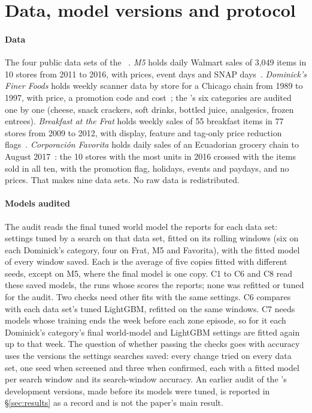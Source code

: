 \section{Data, model versions and protocol}
\label{sec:versions}

\paragraph{Data}
The four public data sets of the \companion{} ~\cite{rwm}. \emph{M5} holds
daily Walmart sales of 3,049 items in 10 stores from 2011 to 2016, with prices,
event days and SNAP days~\cite{m5accuracy}. \emph{Dominick's Finer Foods} holds
weekly scanner data by store for a Chicago chain from 1989 to 1997, with price,
a promotion code and cost~\cite{dominicks}; the \companion{} 's six
categories are audited one by one (cheese, snack crackers, soft drinks, bottled
juice, analgesics, frozen entrees). \emph{Breakfast at the Frat} holds weekly
sales of 55 breakfast items in 77 stores from 2009 to 2012, with display,
feature and tag-only price reduction flags~\cite{frat}. \emph{Corporaci\'on
Favorita} holds daily sales of an Ecuadorian grocery chain to August
2017~\cite{favorita}: the 10 stores with the most units in 2016 crossed with the
items sold in all ten, with the promotion flag, holidays, events and paydays,
and no prices. That makes nine data sets. No raw data is redistributed.

\paragraph{Models audited}
The audit reads the final tuned world model the \companion{}  reports for
each data set: settings tuned by a search on that data set, fitted on its
rolling windows (six on each Dominick's category, four on Frat, M5 and
Favorita), with the fitted model of every window saved. Each is the average of
five copies fitted with different seeds, except on M5, where the final model
is one copy. C1 to C6 and C8 read these saved models, the runs whose scores
the \companion{}  reports; none was refitted or tuned for the audit. Two
checks need other fits with the same settings. C6 compares with each data
set's tuned LightGBM, refitted on the same windows. C7 needs models whose
training ends the week before each zone episode, so for it each Dominick's
category's final world-model and LightGBM settings are fitted again up to that
week. The question of whether passing the checks goes with accuracy uses the
versions the settings searches saved: every change tried on every data set,
one seed when screened and three when confirmed, each with a fitted model per
search window and its search-window accuracy. An earlier audit of the
\companion{} 's development versions, made before its models
were tuned, is reported in \S\ref{sec:results} as a record and is not the
paper's main result.

